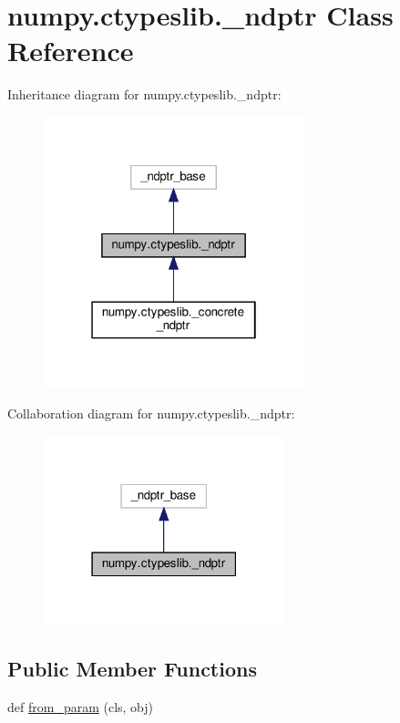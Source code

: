 \hypertarget{classnumpy_1_1ctypeslib_1_1__ndptr}{}\section{numpy.\+ctypeslib.\+\_\+ndptr Class Reference}
\label{classnumpy_1_1ctypeslib_1_1__ndptr}


Inheritance diagram for numpy.\+ctypeslib.\+\_\+ndptr\+:
\nopagebreak
\begin{figure}[H]
\begin{center}
\leavevmode
\includegraphics[width=214pt]{classnumpy_1_1ctypeslib_1_1__ndptr__inherit__graph}
\end{center}
\end{figure}


Collaboration diagram for numpy.\+ctypeslib.\+\_\+ndptr\+:
\nopagebreak
\begin{figure}[H]
\begin{center}
\leavevmode
\includegraphics[width=198pt]{classnumpy_1_1ctypeslib_1_1__ndptr__coll__graph}
\end{center}
\end{figure}
\subsection*{Public Member Functions}
\begin{DoxyCompactItemize}
\item 
def \hyperlink{classnumpy_1_1ctypeslib_1_1__ndptr_a2436b4c9fdafa035133cc4c471467251}{from\+\_\+param} (cls, obj)
\end{DoxyCompactItemize}



